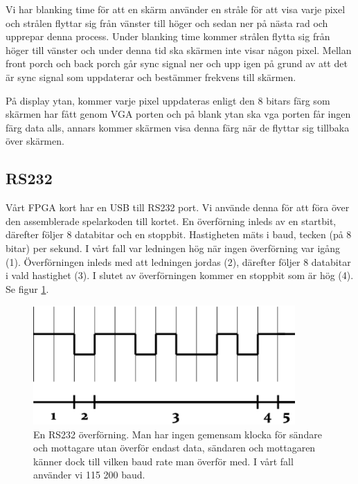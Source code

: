 \documentclass[11pt]{article}
\begin{document}
Vi har blanking time för att en skärm använder en stråle för att visa varje pixel och strålen flyttar sig från vänster till höger och sedan ner på nästa rad och upprepar denna process. Under blanking time kommer strålen flytta sig från höger till vänster och under denna tid ska skärmen inte visar någon pixel. Mellan front porch och back porch går sync signal ner och upp igen på grund av att det är sync signal som uppdaterar och bestämmer frekvens till skärmen.

På display ytan, kommer varje pixel uppdateras enligt den 8 bitars färg som skärmen har fått genom VGA porten och på blank ytan ska vga porten får ingen färg data alls, annars kommer skärmen visa denna färg när de flyttar sig tillbaka över skärmen.

\subsection{RS232}

Vårt FPGA kort har en USB till RS232 port. Vi använde denna för att föra över den assemblerade spelarkoden till kortet. En överförning inleds av en startbit, därefter följer 8 databitar och en stoppbit. Hastigheten mäts i baud, tecken (på 8 bitar) per sekund. I vårt fall var ledningen hög när ingen överförning var igång (1). Överförningen inleds med att ledningen jordas (2), därefter följer 8 databitar i vald hastighet (3). I slutet av överförningen kommer en stoppbit som är hög (4). Se figur \ref{fig:rs232}.

\begin{figure}[h]
    \begin{center}
        \includegraphics[width=10cm]{rs232.eps}
        \caption{En RS232 överförning. Man har ingen gemensam klocka för sändare och mottagare utan överför endast data, sändaren och mottagaren känner dock till vilken baud rate man överför med. I vårt fall använder vi 115 200 baud.}
        \label{fig:rs232}
    \end{center}
\end{figure}
\end{document}
